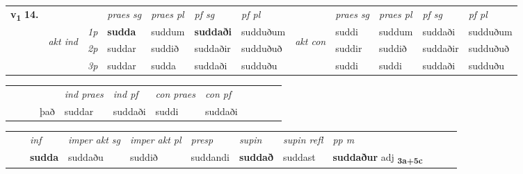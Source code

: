 \begin{tabular}{llllllllllll} \toprule
\multirow{4}{*}{{{\textbf{v{\textsubscript{1}}} \Large{\textbf{14.}}}}}  & &   &  \textit{praes sg}  & \textit{praes pl}  &\textit{ pf sg} & \textit{pf pl} &  &  \textit{praes sg}  & \textit{praes pl}  & \textit{pf sg} & \textit{pf pl } \\*
	\cmidrule{4-7} \cmidrule{9-12}
 & \multirow{3}{*}{\begin{turn}{90}\textit{akt ind}\end{turn}} & {\textit{1p}} & \textbf{sudda} & suddum    & \textbf{suddaði} & sudduðum & \multirow{3}{*}{\begin{turn}{90}\textit{akt con}\end{turn}} &suddi & suddum & suddaði & sudduðum\\*
& &  {\textit{2p}} &  suddar  & suddið   & suddaðir & sudduðuð & & suddir & suddið & suddaðir & sudduðuð \\*
& &  {\textit{3p}} & suddar & sudda   & suddaði & sudduðu & & suddi & suddi& suddaði & sudduðu  \\*
\cmidrule{4-7} \cmidrule{9-12}
\end{tabular}


\begin{tabular}{llllllllllll}
 & &  & &  \textit{ind praes} & \textit{ind pf} & \textit{con praes} & \textit{con pf} \\*
&  & & það & suddar & suddaði & suddi & suddaði \\*
\cmidrule{5-9}
\end{tabular}


\begin{tabular}{llllllllllll}
 & & \textit{inf} & \textit{imper akt sg} & \textit{imper akt pl}   & \textit{presp} & \textit{supin} & \textit{supin refl} & \textit{pp m}     \\*
  & & \textbf{sudda} & suddaðu  & suddið   & suddandi &  \textbf{suddað} & suddast & \textbf{suddaður} adj \textbf{\textsubscript{3a+5c}} \\*
\cmidrule{1-12}
\end{tabular}



